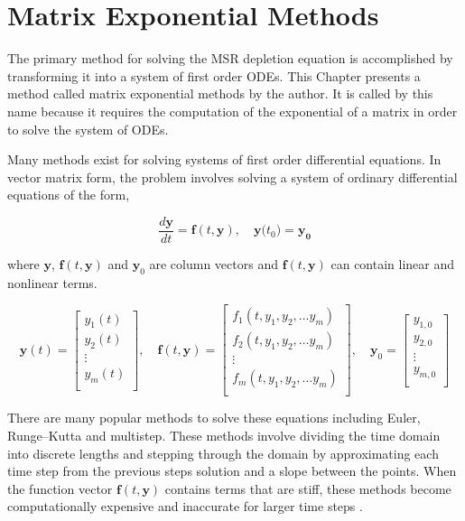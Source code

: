 \chapter{Matrix Exponential Methods}\label{ch:matrixEXPMethods}
The primary method for solving the MSR depletion equation is accomplished by transforming it into a system of first order ODEs. This Chapter presents a method called  matrix exponential methods by the author. It is called by this name because it requires the computation of the exponential of a matrix in order to solve the system of ODEs.

Many methods exist for solving systems of first order differential equations. In vector matrix form, the problem involves solving a system of ordinary differential equations of the form,

\begin{equation}
    \frac{d\boldsymbol{y}}{dt} = \boldsymbol{f}(t,\boldsymbol{y}), \quad \boldsymbol{y}({t_{0})} = \boldsymbol{y_{0}}
    \label{eq:ODE_matrix_form}
\end{equation}{}

\noindent
where $\boldsymbol{y}$, $\boldsymbol{f}(t,\boldsymbol{y})$ and $\boldsymbol{y}_{0}$ are column vectors and $\boldsymbol{f}(t,\boldsymbol{y})$ can contain linear and nonlinear terms. 

$$
\boldsymbol{y}(t) = 
\begin{bmatrix}
y_{1}(t) \\
y_{2}(t) \\
\vdots \\
y_{m}(t) \\
\end{bmatrix}, \quad 
\boldsymbol{f}(t,\boldsymbol{y}) = 
\begin{bmatrix}
f_{1}(t, y_{1}, y_{2}, \dots y_{m}) \\ 
f_{2}(t, y_{1}, y_{2}, \dots y_{m}) \\ 
\vdots \\
f_{m}(t, y_{1}, y_{2}, \dots y_{m}) \\ 
\end{bmatrix}, \quad
\boldsymbol{y}_{0} = 
\begin{bmatrix}
y_{1,0} \\
y_{2,0} \\
\vdots \\ 
y_{m,0} \\
\end{bmatrix}
$$

There are many popular methods to solve these equations including Euler, Runge–Kutta and multistep. These methods involve dividing the time domain into discrete lengths and stepping through the domain by approximating each time step from the previous steps solution and a slope between the points. When the function vector $\boldsymbol{f}(t,\boldsymbol{y})$ contains terms that are stiff, these methods become computationally expensive and inaccurate for larger time steps \cite{ash2009} \cite{ODECh82011}.

